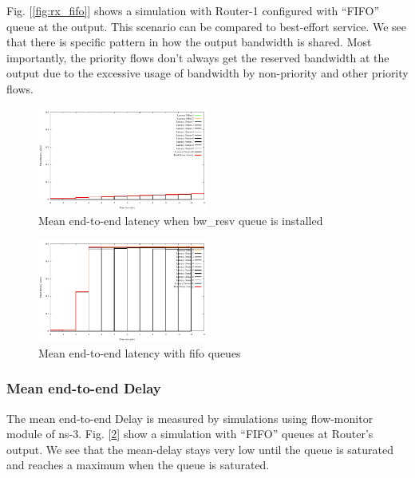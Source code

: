 \documentclass[10pt,sigconf,letterpaper,anonymous]{acmart}
\begin{document}
Fig. [\ref{fig:rx_fifo}] shows a simulation with Router-1 configured with ``FIFO'' queue at the output. This scenario can be compared to best-effort service. We see that there is specific pattern in how the output bandwidth is shared. Most importantly, the priority flows don't always get the reserved bandwidth at the output due to the excessive usage of bandwidth by non-priority and other priority flows.

\begin{figure}[ht]
	\begin{center}
		\includegraphics[width=0.50\textwidth]{plots/delay_detnet.pdf}
		\caption{Mean end-to-end latency when bw\_resv queue is installed}\label{fig:delay_detnet}
	\end{center}
\end{figure}
\begin{figure}[ht]
	\begin{center}
		\includegraphics[width=0.50\textwidth]{plots/delay_fifo.pdf}
		\caption{Mean end-to-end latency with fifo queues}\label{fig:delay_fifo}
	\end{center}
\end{figure}

\subsubsection{Mean end-to-end Delay}
The mean end-to-end Delay is measured by simulations using flow-monitor module of ns-3. Fig. [\ref{fig:delay_fifo}] show a simulation with ``FIFO'' queues at Router's output. We see that the mean-delay stays very low until the queue is saturated and reaches a maximum when the queue is saturated. 
\end{document}
